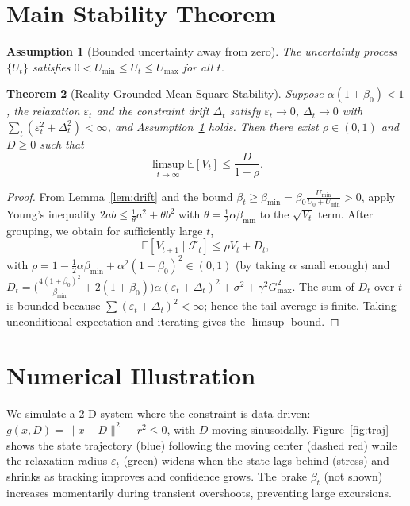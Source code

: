 \documentclass{article}
\newtheorem{theorem}{Theorem}[section]
\newtheorem{assumption}[theorem]{Assumption}
\begin{document}
\section{Main Stability Theorem}
\label{sec:stability}

\begin{assumption}[Bounded uncertainty away from zero]\label{ass:Umin}
The uncertainty process $\{U_t\}$ satisfies $0 < U_{\min} \le U_t \le U_{\max}$ for all $t$.
\end{assumption}

\begin{theorem}[Reality‑Grounded Mean‑Square Stability]\label{thm:stability}
Suppose $\alpha(1+\beta_0)<1$, the relaxation $\varepsilon_t$ and the constraint drift $\Delta_t$ satisfy $\varepsilon_t\to0$, $\Delta_t\to0$ with $\sum_t (\varepsilon_t^2+\Delta_t^2)<\infty$, and Assumption~\ref{ass:Umin} holds. Then there exist $\rho\in(0,1)$ and $D\ge0$ such that
\[
\limsup_{t\to\infty} \mathbb{E}[V_t] \le \frac{D}{1-\rho}.
\]
\end{theorem}
\begin{proof}
From Lemma~\ref{lem:drift} and the bound $\beta_t \ge \beta_{\min} = \beta_0\frac{U_{\min}}{U_0+U_{\min}}>0$, apply Young's inequality $2ab \le \frac{1}{\theta}a^2 + \theta b^2$ with $\theta = \frac12 \alpha\beta_{\min}$ to the $\sqrt{V_t}$ term. After grouping, we obtain for sufficiently large $t$,
\[
\mathbb{E}[V_{t+1}\mid\mathcal{F}_t] \le \rho V_t + D_t,
\]
with $\rho = 1 - \frac12 \alpha\beta_{\min} + \alpha^2(1+\beta_0)^2 \in (0,1)$ (by taking $\alpha$ small enough) and
$D_t = \bigl(\frac{4(1+\beta_0)^2}{\beta_{\min}} + 2(1+\beta_0)\bigr) \alpha(\varepsilon_t+\Delta_t)^2 + \sigma^2 + \gamma^2 G_{\max}^2$.
The sum of $D_t$ over $t$ is bounded because $\sum (\varepsilon_t+\Delta_t)^2<\infty$; hence the tail average is finite. Taking unconditional expectation and iterating gives the $\limsup$ bound.
\end{proof}

\section{Numerical Illustration}
\label{sec:simulation}

We simulate a 2‑D system where the constraint is data‑driven: $g(x,D) = \|x - D\|^2 - r^2 \le 0$, with $D$ moving sinusoidally. Figure~\ref{fig:traj} shows the state trajectory (blue) following the moving center (dashed red) while the relaxation radius $\varepsilon_t$ (green) widens when the state lags behind (stress) and shrinks as tracking improves and confidence grows. The brake $\beta_t$ (not shown) increases momentarily during transient overshoots, preventing large excursions.
\end{document}
